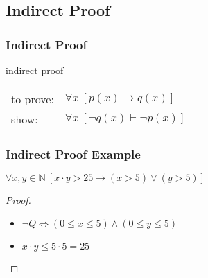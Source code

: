 \documentclass[dvipsnames]{beamer}
\begin{document}
\subsection{Indirect Proof}

\begin{frame}
  \frametitle{Indirect Proof}

  \begin{block}{indirect proof}
    \begin{tabular}{ll}
      to prove: & $\forall x~[p(x) \rightarrow q(x)]$\\
      show:     & $\forall x~[\neg q(x) \vdash \neg p(x)]$
    \end{tabular}
  \end{block}
\end{frame}

\begin{frame}
  \frametitle{Indirect Proof Example}

  \begin{theorem}
    $\forall x,y \in \mathbb{N}~[x \cdot y > 25
      \rightarrow (x > 5) \vee (y > 5)]$
  \end{theorem}

  \pause
  \begin{proof}
    \begin{itemize}
      \item $\neg Q \Leftrightarrow (0 \leq x \leq 5) \wedge (0 \leq y \leq 5)$

      \pause
      \item $x \cdot y \leq 5 \cdot 5 = 25$
    \end{itemize}
  \end{proof}
\end{frame}
\end{document}

